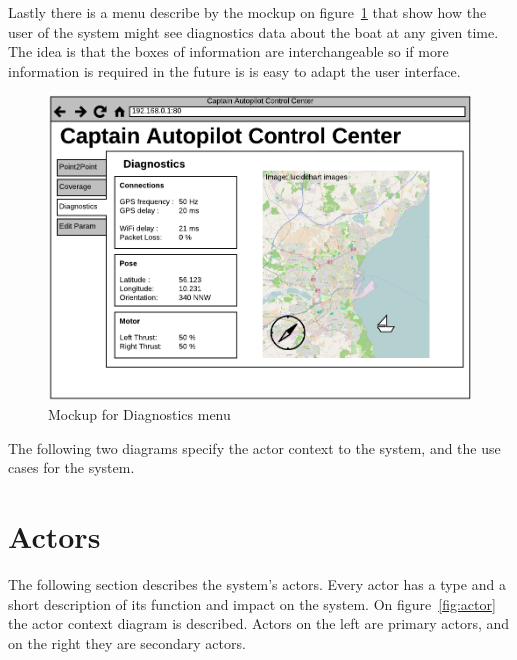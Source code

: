 Lastly there is a menu describe by the mockup on figure~\ref{fig:mockup:diagnostics} that show how the user of the system might see diagnostics data about the boat at any given time. The idea is that the boxes of information are interchangeable so if more information is required in the future is is easy to adapt the user interface.

\begin{figure}[H]
	\centering
	\includegraphics[width=1\linewidth]{Images/Requirements_specification/UI_Mockup_Diagnostics.pdf}
	\caption{Mockup for Diagnostics menu}
	\label{fig:mockup:diagnostics}
\end{figure}


The following two diagrams specify the actor context to the system, and the use cases for the system.

\section{Actors}
The following section describes the system's actors. Every actor has a type and a short description of its function and impact on the system. On figure~\ref{fig:actor} the actor context diagram is described. Actors on the left are primary actors, and on the right they are secondary actors.

